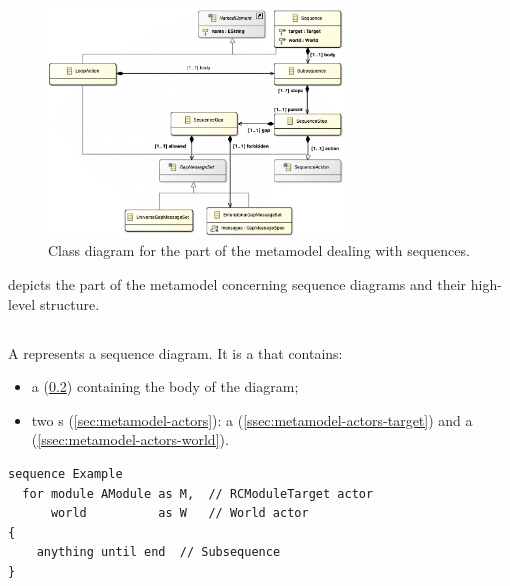 \begin{figure}
	\centering
	\includegraphics[width=0.7\textwidth]{diagrams/sequences.png}
	\caption{Class diagram for the part of the \langname{} metamodel dealing with sequences.}
	\label{fig:metamodel-sequences}
\end{figure}

 depicts the part of the metamodel concerning
sequence diagrams and their high-level structure.

\subsection{\msequence}

A \msequence{} represents a sequence diagram.  It is a \mnamedelement{}
that contains:

\begin{itemize}
\item
	a \msubsequence{} (\cref{ssec:metamodel-sequences-subsequences})
	containing the body of the diagram;
\item
	two \mactor s (\cref{sec:metamodel-actors}):
	a \mtarget{} (\cref{ssec:metamodel-actors-target})
	and a \mworld{} (\cref{ssec:metamodel-actors-world}).
\end{itemize}

\begin{lstlisting}[style=Example]
sequence Example
  for module AModule as M,  // RCModuleTarget actor
      world          as W   // World actor
{
    anything until end  // Subsequence
}
\end{lstlisting}

\subsection{\msubsequence}\label{ssec:metamodel-sequences-subsequences}

